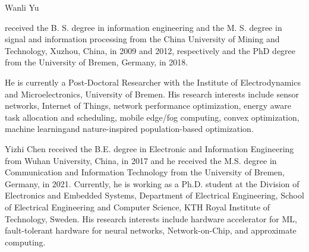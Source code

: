 \begin{IEEEbiography}{Wanli Yu}
	
	received the B. S. degree in information engineering and the M. S. degree in signal and information processing from the China University of Mining and Technology, Xuzhou, China, in 2009 and 2012, respectively and the PhD degree from the University of Bremen, Germany, in 2018.
	
	He is currently a Post-Doctoral Researcher with the Institute of Electrodynamics and Microelectronics, University of Bremen. His research interests include sensor networks, Internet of Things, network performance optimization, energy aware task allocation and scheduling, mobile edge/fog computing, convex optimization, machine learningand nature-inspired population-based optimization.
\end{IEEEbiography}

\begin{IEEEbiography}{Yizhi Chen} received the B.E. degree in Electronic and Information Engineering from Wuhan University, China, in 2017 and he received the M.S. degree in Communication and Information Technology from the University of Bremen, Germany, in 2021. Currently, he is working as a Ph.D. student at the Division of Electronics and Embedded Systems, Department of Electrical Engineering, School of Electrical Engineering and Computer Science, KTH Royal Institute of Technology, Sweden. His research interests include hardware accelerator for ML, fault-tolerant hardware for neural networks, Network-on-Chip, and approximate computing.
\end{IEEEbiography}

